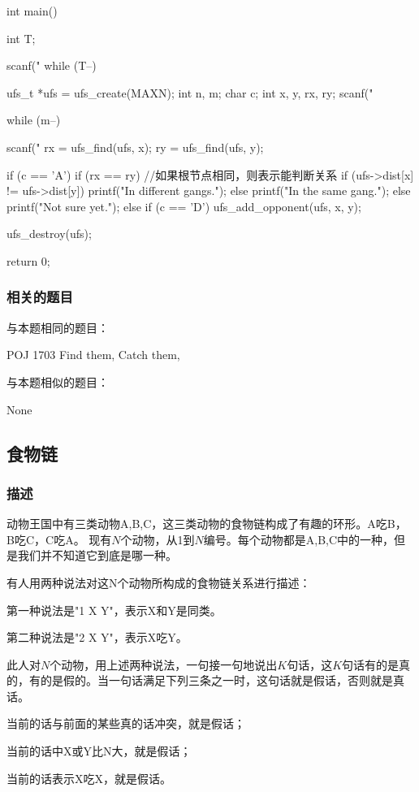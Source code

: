 \begin{Codex}[label=two_gangs.c]
int main() {
    int T;

    scanf("%
    while (T--) {
        ufs_t *ufs = ufs_create(MAXN);
        int n, m;
        char c;
        int x, y, rx, ry;
        scanf("%

        while (m--) {
            scanf("%
            rx = ufs_find(ufs, x);
            ry = ufs_find(ufs, y);

            if (c == 'A') {
                if (rx == ry) { //如果根节点相同，则表示能判断关系
                    if (ufs->dist[x] != ufs->dist[y])
                        printf("In different gangs.\n");
                    else
                        printf("In the same gang.\n");
                } else
                    printf("Not sure yet.\n");
            } else if (c == 'D') {
                ufs_add_opponent(ufs, x, y);
            }
        }
        ufs_destroy(ufs);
    }
    return 0;
}
\end{Codex}

\subsubsection{相关的题目}
与本题相同的题目：
\begindot
\item POJ 1703 Find them, Catch them, 
\myenddot

与本题相似的题目：
\begindot
\item  None
\myenddot


\subsection{食物链} %
\subsubsection{描述}
动物王国中有三类动物A,B,C，这三类动物的食物链构成了有趣的环形。A吃B， B吃C，C吃A。 现有$N$个动物，从1到$N$编号。每个动物都是A,B,C中的一种，但是我们并不知道它到底是哪一种。 

有人用两种说法对这N个动物所构成的食物链关系进行描述：
\begindot
\item 第一种说法是"1 X Y"，表示X和Y是同类。 
\item 第二种说法是"2 X Y"，表示X吃Y。 
\myenddot

此人对$N$个动物，用上述两种说法，一句接一句地说出$K$句话，这$K$句话有的是真的，有的是假的。当一句话满足下列三条之一时，这句话就是假话，否则就是真话。 
\begindot
\item 当前的话与前面的某些真的话冲突，就是假话； 
\item 当前的话中X或Y比N大，就是假话； 
\item 当前的话表示X吃X，就是假话。 
\myenddot

